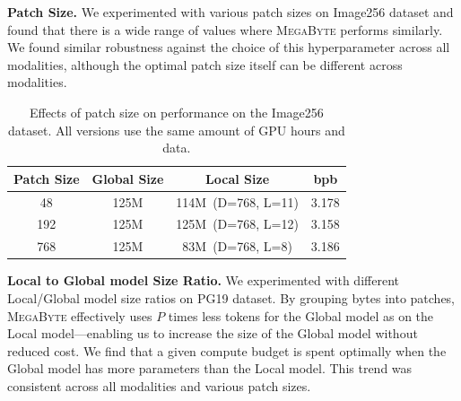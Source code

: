 \documentclass{article}
\newcommand{\fastslow}[0]{\textsc{MegaByte}\xspace}
\newcommand{\megabyte}[0]{\fastslow}
\newcommand{\bpb}[0]{bpb\xspace}
\newcommand{\mike}[1]{\textcolor{blue}{[Mike: #1]}}
\theoremstyle{plain}
\theoremstyle{definition}
\theoremstyle{remark}
\begin{document}

\textbf{Patch Size.} We experimented with various patch sizes on Image256 dataset and found that there is a wide range of values where \megabyte performs similarly. We found similar robustness against the choice of this hyperparameter across all modalities, although the optimal patch size itself can be different across modalities.

\begin{table}[h]
    \centering\small
    \begin{tabular}{cccc}
    \toprule
    Patch Size & Global Size & Local Size & \bpb \\
    \midrule
    48 & 125M & 114M~(D=768, L=11)  & 3.178 \\
    192 & 125M & 125M~(D=768, L=12)  & 3.158 \\
    768 & 125M & 83M~(D=768, L=8) & 3.186 \\
    \bottomrule
    \end{tabular}
    \caption{Effects of patch size on performance on the Image256 dataset. All versions use the same amount of GPU hours and data.}
    \label{tab:hyperparams_ablation}
\end{table}


\textbf{Local to Global model Size Ratio.} We experimented with different Local/Global model size ratios on PG19 dataset. By grouping bytes into patches, \megabyte effectively uses $P$ times less tokens for the Global model as on the Local model---enabling us to increase the size of the Global model without reduced cost. We find that a given compute budget is spent optimally when the Global model has more parameters than the Local model. This trend was consistent across all modalities and various patch sizes.
\end{document}
